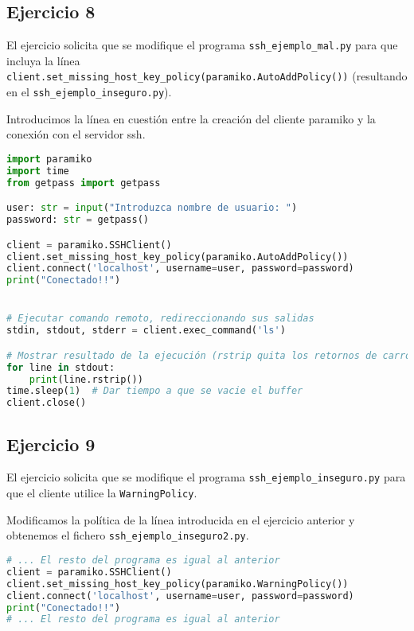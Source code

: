 \subsection{Ejercicio 8}

El ejercicio solicita que se modifique el programa \lstinline{ssh_ejemplo_mal.py}
para que incluya la línea \lstinline{client.set_missing_host_key_policy(paramiko.AutoAddPolicy())}
(resultando en el \lstinline{ssh_ejemplo_inseguro.py}).

Introducimos la línea en cuestión entre la creación del cliente paramiko
y la conexión con el servidor ssh.

\begin{lstlisting}[language=Python]
import paramiko
import time
from getpass import getpass

user: str = input("Introduzca nombre de usuario: ")
password: str = getpass()

client = paramiko.SSHClient()
client.set_missing_host_key_policy(paramiko.AutoAddPolicy())
client.connect('localhost', username=user, password=password)
print("Conectado!!")


# Ejecutar comando remoto, redireccionando sus salidas
stdin, stdout, stderr = client.exec_command('ls')

# Mostrar resultado de la ejecución (rstrip quita los retornos de carro)
for line in stdout:
    print(line.rstrip())
time.sleep(1)  # Dar tiempo a que se vacie el buffer
client.close()
\end{lstlisting}

\subsection{Ejercicio 9}

El ejercicio solicita que se modifique el programa \lstinline{ssh_ejemplo_inseguro.py}
para que el cliente utilice la \lstinline{WarningPolicy}.

Modificamos la política de la línea introducida en el ejercicio anterior y
obtenemos el fichero \lstinline{ssh_ejemplo_inseguro2.py}.

\begin{lstlisting}[language=Python]
# ... El resto del programa es igual al anterior
client = paramiko.SSHClient()
client.set_missing_host_key_policy(paramiko.WarningPolicy())
client.connect('localhost', username=user, password=password)
print("Conectado!!")
# ... El resto del programa es igual al anterior
\end{lstlisting}

